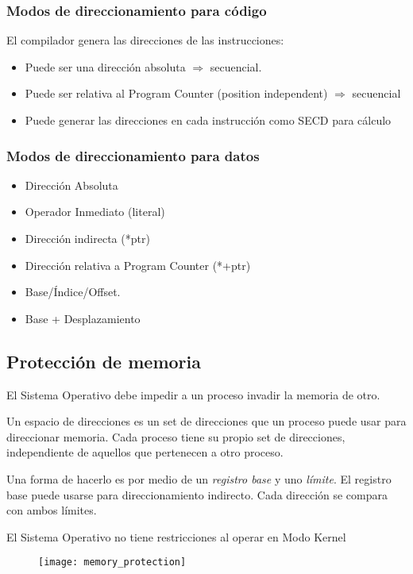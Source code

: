 \documentclass[a4paper, twoside]{article}
\begin{document}
\subsubsection{Modos de direccionamiento para código}
El compilador genera las direcciones de las instrucciones:
\begin{itemize}
	\item Puede ser una dirección absoluta $\Rightarrow$ secuencial.
	\item Puede ser relativa al Program Counter (position independent) $\Rightarrow$ secuencial
	\item Puede generar las direcciones en cada instrucción como SECD para cálculo
\end{itemize}

\subsubsection{Modos de direccionamiento para datos}
\begin{itemize}
	\item Dirección Absoluta
	\item Operador Inmediato (literal)
	\item Dirección indirecta (*ptr)
	\item Dirección relativa a Program Counter (*+ptr)
	\item Base/Índice/Offset.
	\item Base + Desplazamiento
\end{itemize}

\subsection{Protección de memoria}
El Sistema Operativo debe impedir a un proceso invadir la memoria de otro.

Un espacio de direcciones es un set de direcciones que un proceso puede usar para direccionar memoria. Cada proceso tiene su propio set de direcciones, independiente de aquellos que pertenecen a otro proceso.

Una forma de hacerlo es por medio de un \emph{registro base} y uno \emph{límite}. El registro base puede usarse para direccionamiento indirecto. Cada dirección se compara con ambos límites.

El Sistema Operativo no tiene restricciones al operar en Modo Kernel

\begin{figure}[H]
	\centering
	\texttt{[image: memory\_protection]}
	\label{fig:memory_protection}
\end{figure}
\end{document}
